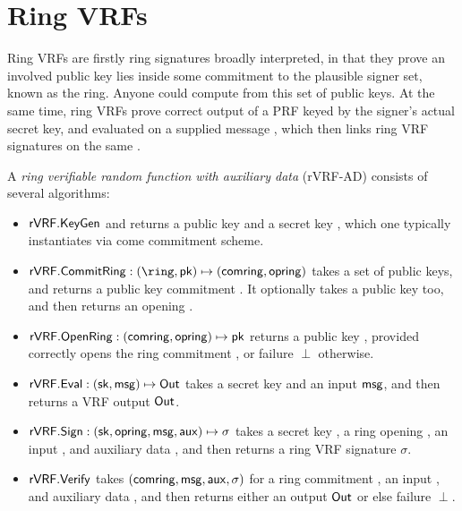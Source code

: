 \section{Ring VRFs}
\label{sec:rvrf}

Ring VRFs are firstly ring signatures broadly interpreted, in that they
prove an involved public key lies inside some commitment \comring to
the plausible signer set, known as the ring.
Anyone could compute \comring from this set of public keys.
%
At the same time, ring VRFs prove correct output of a PRF keyed by
the signer's actual secret key, and evaluated on a supplied message \msg,
which then links ring VRF signatures on the same \msg.

\begin{definition}
A {\em ring verifiable random function with auxiliary data} (rVRF-AD)
consists of several algorithms:
\begin{itemize}
	\item ${\mathsf{rVRF}}.{\mathsf{KeyGen}}$ and returns a public key \pk and a secret key \sk, which one typically instantiates via come commitment scheme. 
	\item $\rVRF.\CommitRing : (\ring,\pk) \mapsto (\comring,\openring)$ takes a set \ring of public keys, and returns a public key commitment \comring.  It optionally takes a public key \pk too, and then returns an opening \openring.
	\item ${\mathsf{rVRF}}.{\mathsf{OpenRing}} : (\mathsf{comring},\mathsf{opring}) \mapsto \mathsf{pk}$ returns a public key \pk, provided \openring correctly opens the ring commitment \comring, or failure $\perp$ otherwise.
	\item ${\mathsf{rVRF}}.{\mathsf{Eval}} : (\mathsf{sk},\mathsf{msg}) \mapsto {\ensuremath{\mathsf{Out}}}$  takes a secret key \sk and an input $\mathsf{msg}$, and then returns a VRF output ${\mathsf{Out}}$.
	\item ${\mathsf{rVRF}}.{\mathsf{Sign}} : (\mathsf{sk},\mathsf{opring},\mathsf{msg},\mathsf{aux}) \mapsto \sigma$ takes a secret key \sk, a ring opening \openring, an input \msg, and auxiliary data \aux, and then returns a ring VRF signature $\sigma$.
	\item ${\mathsf{rVRF}}.{\mathsf{Verify}}$ takes $(\mathsf{comring},\mathsf{msg},\mathsf{aux},\sigma)$ for a ring commitment \comring, an input \msg, and auxiliary data \aux, and then returns either an output ${\mathsf{Out}}$ or else failure $\perp$.
\end{itemize}
\end{definition}







% 


\endinput
 

